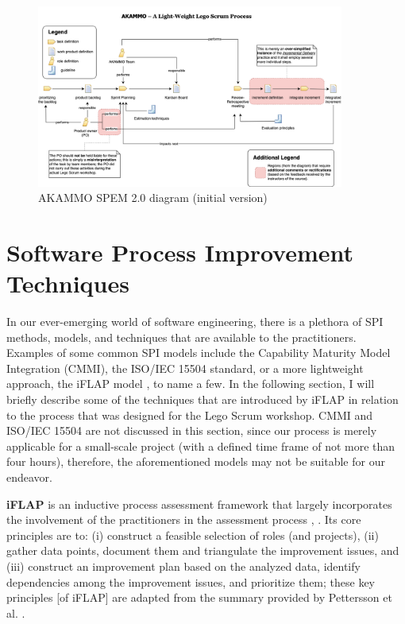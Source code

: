 \documentclass[conference]{IEEEtran}
\begin{document}
\begin{figure}
	\centering
	\includegraphics[width=0.9\textwidth]{process-diagram.png}
  \caption{{\selectfont AKAMMO} SPEM 2.0 diagram (initial version)}
	\label{fig:process-diagram}
\end{figure}

\section{Software Process Improvement Techniques}
\label{sec:spi-techniques}


In our ever-emerging world of software engineering, there is a plethora of SPI
methods, models, and techniques that are available to the practitioners.
Examples of some common SPI models include the Capability Maturity Model
Integration (CMMI), the ISO/IEC 15504 standard, or a more lightweight approach,
the iFLAP model \cite{Pettersson2008}, to name a few. In the following
section, I will briefly describe some of the techniques that are introduced by
iFLAP in relation to the process that was designed for the Lego Scrum workshop.
CMMI and ISO/IEC 15504 are not discussed in this section, since our process is
merely applicable for a small-scale project (with a defined time frame of not
more than four hours), therefore, the aforementioned models may not be suitable
for our endeavor.

\textbf{{\selectfont iFLAP}} is an inductive process assessment
framework that largely incorporates the involvement of the practitioners in the
assessment process \cite{Pettersson2008}, \cite{Malvius2009}. Its core
principles are to: (i) construct a feasible selection of roles (and projects),
(ii) gather data points, document them and triangulate the improvement issues,
and (iii) construct an improvement plan based on the analyzed data, identify
dependencies among the improvement issues, and prioritize them; these key
principles [of iFLAP] are adapted from the summary provided by Pettersson et
al. \cite{Pettersson2008}.
\end{document}
